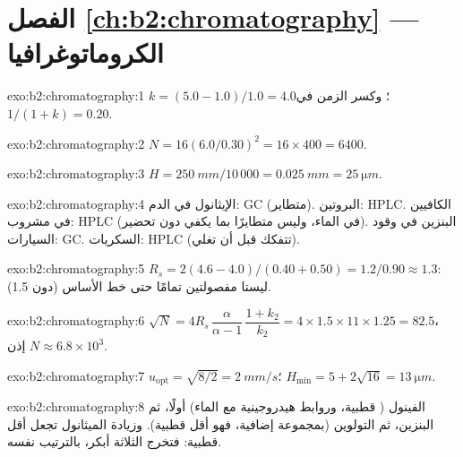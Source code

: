\section*{الفصل \ref{ch:b2:chromatography} --- الكروماتوغرافيا}

\begin{solution}{exo:b2:chromatography:1}
$k = (5.0 - 1.0)/1.0 = 4.0$؛ وكسر الزمن في  $1/(1 + k) = 0.20$.
\end{solution}

\begin{solution}{exo:b2:chromatography:2}
$N = 16(6.0/0.30)^2 = 16 \times 400 = 6400$.
\end{solution}

\begin{solution}{exo:b2:chromatography:3}
$H = \qty{250}{mm}/10\,000 = \qty{0.025}{mm} = \qty{25}{\micro m}$.
\end{solution}

\begin{solution}{exo:b2:chromatography:4}
الإيثانول في الدم: GC (متطاير). البروتين: HPLC. الكافيين في مشروب: HPLC (في الماء، وليس متطايرًا
بما يكفي دون تحضير). البنزين في وقود السيارات: GC. السكريات: HPLC (تتفكك قبل أن تغلي).
\end{solution}

\begin{solution}{exo:b2:chromatography:5}
$R_s = 2(4.6 - 4.0)/(0.40 + 0.50) = 1.2/0.90 \approx 1.3$: ليستا مفصولتين تمامًا حتى خط الأساس (دون 1.5).
\end{solution}

\begin{solution}{exo:b2:chromatography:6}
$\sqrt N = 4R_s\,\dfrac{\alpha}{\alpha - 1}\,\dfrac{1 + k_2}{k_2} = 4 \times 1.5 \times 11 \times 1.25 =
82.5$، إذن $N \approx 6.8 \times 10^3$.
\end{solution}

\begin{solution}{exo:b2:chromatography:7}
$u_{\mathrm{opt}} = \sqrt{8/2} = \qty{2}{mm/s}$؛ $H_{\min} = 5 + 2\sqrt{16} = \qty{13}{\micro m}$.
\end{solution}

\begin{solution}{exo:b2:chromatography:8}
الفينول ( قطبية، وروابط هيدروجينية مع الماء) أولًا، ثم البنزين، ثم التولوين (بمجموعة
 إضافية، فهو أقل قطبية). وزيادة الميثانول تجعل  أقل قطبية: فتخرج الثلاثة أبكر، بالترتيب
نفسه.
\end{solution}

